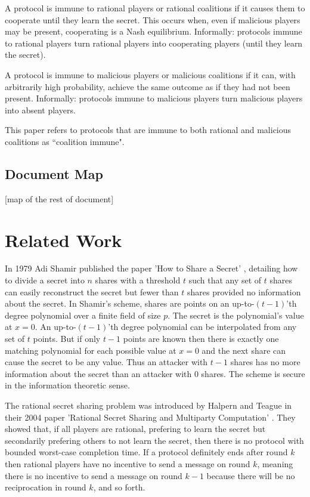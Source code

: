 \documentclass{dalcsthesis}
\begin{document}
A protocol is immune to rational players or rational coalitions if it causes them to cooperate until they learn the secret. This occurs when, even if malicious players may be present, cooperating is a Nash equilibrium. Informally: protocols immune to rational players turn rational players into cooperating players (until they learn the secret).

A protocol is immune to malicious players or malicious coalitions if it can, with arbitrarily high probability, achieve the same outcome as if they had not been present. Informally: protocols immune to malicious players turn malicious players into absent players.

This paper refers to protocols that are immune to both rational and malicious coalitions as ``coalition immune".

\section{Document Map}

[map of the rest of document]




\chapter{Related Work}
\label{sec:RelatedWork}

In 1979 Adi Shamir published the paper 'How to Share a Secret' \cite{shamir79}, detailing how to divide a secret into $n$ shares with a threshold $t$ such that any set of $t$ shares can easily reconstruct the secret but fewer than $t$ shares provided no information about the secret. In Shamir's scheme, shares are points on an up-to-$(t-1)$'th degree polynomial over a finite field of size $p$. The secret is the polynomial's value at $x=0$. An up-to-$(t-1)$'th degree polynomial can be interpolated from any set of $t$ points. But if only $t-1$ points are known then there is exactly one matching polynomial for each possible value at $x=0$ and the next share can cause the secret to be any value. Thus an attacker with $t-1$ shares has no more information about the secret than an attacker with $0$ shares. The scheme is secure in the information theoretic sense.

The rational secret sharing problem was introduced by Halpern and Teague in their 2004 paper 'Rational Secret Sharing and Multiparty Computation' \cite{halpern04}. They showed that, if all players are rational, prefering to learn the secret but secondarily prefering others to not learn the secret, then there is no protocol with bounded worst-case completion time. If a protocol definitely ends after round $k$ then rational players have no incentive to send a message on round $k$, meaning there is no incentive to send a message on round $k-1$ because there will be no reciprocation in round $k$, and so forth.
\end{document}
